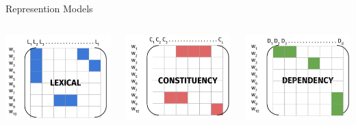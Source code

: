 \documentclass[10pt,=table]{beamer}
\begin{document}
\begin{frame}{Represention Models}
\begin{columns}
\begin{minipage}[c][0.3\textheight][c]{\linewidth}
		 \centering
		 \includegraphics[width=.6\linewidth]{image2/Chapitre1/lexical.pdf}
		\end{minipage}
		\begin{minipage}[c][0.3\textheight][c]{\linewidth}
		 \centering
		 \includegraphics[width=.6\linewidth]{image2/Chapitre1/syn_1.pdf}
		\end{minipage}
		\begin{minipage}[c][0.3\textheight][c]{\linewidth}
		\centering
		\includegraphics[width=.6\linewidth]{image2/Chapitre1/dep_1.pdf}
		\end{minipage}	
	\end{columns}
\end{frame}
\end{document}
